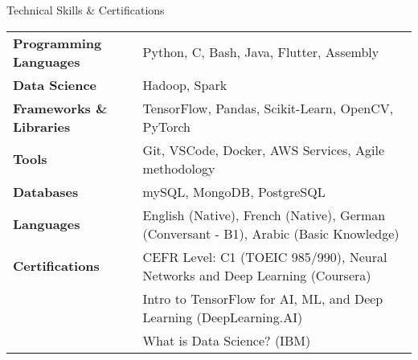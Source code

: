 \documentclass{resume} %
\begin{document}
\begin{rSection}{Technical Skills \& Certifications}

\begin{tabular}{ @{} >{\bfseries}l @{\hspace{6ex}} l }
Programming Languages & Python, C, Bash, Java, Flutter, Assembly \\
Data Science & Hadoop, Spark \\
Frameworks \& Libraries & TensorFlow, Pandas, Scikit-Learn, OpenCV, PyTorch \\
Tools & Git, VSCode, Docker, AWS Services, Agile methodology \\
Databases & mySQL, MongoDB, PostgreSQL \\
Languages & English (Native), French (Native), German (Conversant - B1), Arabic (Basic Knowledge) \\
Certifications & CEFR Level: C1 (TOEIC 985/990), Neural Networks and Deep Learning (Coursera) \\
 & Intro to TensorFlow for AI, ML, and Deep Learning (DeepLearning.AI) \\
 & What is Data Science? (IBM) \\
\end{tabular}

\end{rSection}

\end{document}
